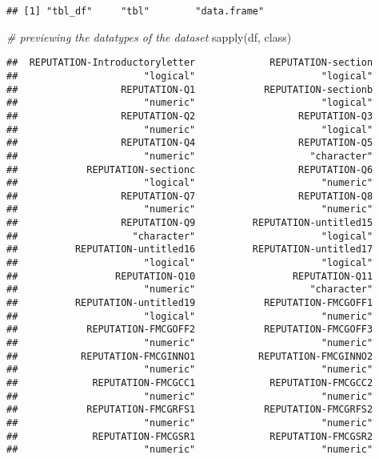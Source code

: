 \documentclass[
]{article}
\newenvironment{Shaded}{\begin{snugshade}}{\end{snugshade}}
\newcommand{\CommentTok}[1]{\textcolor[rgb]{0.56,0.35,0.01}{\textit{#1}}}
\newcommand{\FunctionTok}[1]{\textcolor[rgb]{0.00,0.00,0.00}{#1}}
\newcommand{\NormalTok}[1]{#1}
\begin{document}
\begin{verbatim}
## [1] "tbl_df"     "tbl"        "data.frame"
\end{verbatim}

\begin{Shaded}
\begin{Highlighting}[]
\CommentTok{\# previewing the datatypes of the dataset}
\FunctionTok{sapply}\NormalTok{(df, class)}
\end{Highlighting}
\end{Shaded}

\begin{verbatim}
##  REPUTATION-Introductoryletter             REPUTATION-section 
##                      "logical"                      "logical" 
##                  REPUTATION-Q1            REPUTATION-sectionb 
##                      "numeric"                      "logical" 
##                  REPUTATION-Q2                  REPUTATION-Q3 
##                      "numeric"                      "logical" 
##                  REPUTATION-Q4                  REPUTATION-Q5 
##                      "numeric"                    "character" 
##            REPUTATION-sectionc                  REPUTATION-Q6 
##                      "logical"                      "numeric" 
##                  REPUTATION-Q7                  REPUTATION-Q8 
##                      "numeric"                      "numeric" 
##                  REPUTATION-Q9          REPUTATION-untitled15 
##                    "character"                      "logical" 
##          REPUTATION-untitled16          REPUTATION-untitled17 
##                      "logical"                      "logical" 
##                 REPUTATION-Q10                 REPUTATION-Q11 
##                      "numeric"                    "character" 
##          REPUTATION-untitled19            REPUTATION-FMCGOFF1 
##                      "logical"                      "numeric" 
##            REPUTATION-FMCGOFF2            REPUTATION-FMCGOFF3 
##                      "numeric"                      "numeric" 
##           REPUTATION-FMCGINNO1           REPUTATION-FMCGINNO2 
##                      "numeric"                      "numeric" 
##             REPUTATION-FMCGCC1             REPUTATION-FMCGCC2 
##                      "numeric"                      "numeric" 
##            REPUTATION-FMCGRFS1            REPUTATION-FMCGRFS2 
##                      "numeric"                      "numeric" 
##             REPUTATION-FMCGSR1             REPUTATION-FMCGSR2 
##                      "numeric"                      "numeric" 

\end{verbatim}
\end{document}
